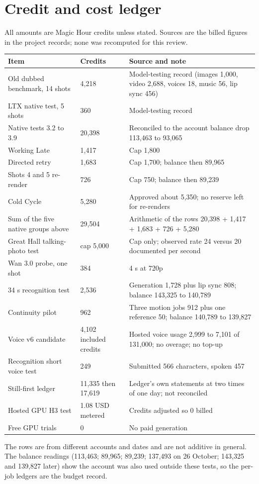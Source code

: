 \documentclass[11pt,a4paper]{article}
\begin{document}
\section{Credit and cost ledger}
\label{sec:ledger}
All amounts are Magic Hour credits unless stated. Sources are the billed figures in the project records; none was recomputed for this review.
\begin{longtable}{@{}P{4.4cm}P{2.4cm}P{8.7cm}@{}}
\toprule \textbf{Item} & \textbf{Credits} & \textbf{Source and note}\\ \midrule\endhead
Old dubbed benchmark, 14 shots & 4,218 & Model-testing record (images 1,000, video 2,688, voices 18, music 56, lip sync 456)\\
LTX native test, 5 shots & 360 & Model-testing record\\
Native tests 3.2 to 3.9 & 20,398 & Reconciled to the account balance drop 113,463 to 93,065\\
Working Late & 1,417 & Cap 1,800\\
Directed retry & 1,683 & Cap 1,700; balance then 89,965\\
Shots 4 and 5 re-render & 726 & Cap 750; balance then 89,239\\
Cold Cycle & 5,280 & Approved about 5,350; no reserve left for re-renders\\
Sum of the five native groups above & 29,504 & Arithmetic of the rows 20,398 + 1,417 + 1,683 + 726 + 5,280\\
Great Hall talking-photo test & cap 5,000 & Cap only; observed rate 24 versus 20 documented per second\\
Wan 3.0 probe, one shot & 384 & 4 s at 720p\\
34 s recognition test & 2,536 & Generation 1,728 plus lip sync 808; balance 143,325 to 140,789\\
Continuity pilot & 962 & Three motion jobs 912 plus one reference 50; balance 140,789 to 139,827\\
Voice v6 candidate & 4,102 included credits & Hosted voice usage 2,999 to 7,101 of 131,000; no overage; no top-up\\
Recognition short voice test & 249 & Submitted 566 characters, spoken 457\\
Still-first ledger & 11,335 then 17,619 & Ledger's own statements at two times of one day; not reconciled\\
Hosted GPU H3 test & 1.08 USD metered & Credits adjusted so 0 billed\\
Free GPU trials & 0 & No paid generation\\
\bottomrule
\end{longtable}
The rows are from different accounts and dates and are not additive in general. The balance readings (113,463; 89,965; 89,239; 137,493 on 26 October; 143,325 and 139,827 later) show the account was also used outside these tests, so the per-job ledgers are the budget record.
\end{document}
